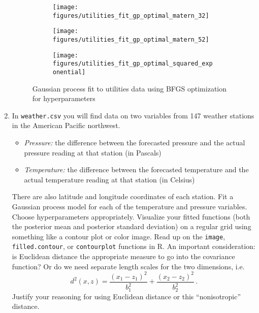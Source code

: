 \documentclass[10pt]{article}
\begin{document}
\begin{enumerate}[label=(\Alph*)]
            \begin{figure}
                \centering
                \begin{subfigure}{.5\textwidth}
                  \centering
                  \texttt{[image: figures/utilities\_fit\_gp\_optimal\_matern\_32]}
                \end{subfigure}%
                \begin{subfigure}{.5\textwidth}
                  \centering
                  \texttt{[image: figures/utilities\_fit\_gp\_optimal\_matern\_52]}
                \end{subfigure}
                \begin{subfigure}{.5\textwidth}
                  \centering
                  \texttt{[image: figures/utilities\_fit\_gp\_optimal\_squared\_exponential]}
                \end{subfigure}
            \caption{Gaussian process fit to utilities data using BFGS optimization for hyperparameters}
            \label{fig:gp_fit_utilities_optimal_lm}
            \end{figure}

            \clearpage

            \item In \verb|weather.csv| you will find data on two variables from 147 weather stations in the American Pacific northwest.
            \begin{itemize}
                \item \textit{Pressure:} the difference between the forecasted pressure and the actual pressure reading at that station (in Pascals)
                \item \textit{Temperature:} the difference between the forecasted temperature and the actual temperature reading at that station (in Celsius)
            \end{itemize}
            There are also latitude and longitude coordinates of each  station.  Fit a Gaussian process model for each of the temperature and pressure variables.  Choose hyperparameters appropriately.  Visualize your fitted functions (both the posterior mean and posterior standard deviation) on a regular grid using something like a contour plot or color image.  Read up on the \verb|image|, \verb|filled.contour|, or \verb|contourplot| functions in R.  An important consideration: is Euclidean distance the appropriate measure to go into the covariance function?  Or do we need separate length scales for the two dimensions, i.e.
            $$
            d^2(x, z) = \frac{(x_1 - z_1)^2}{b_1^2} +  \frac{(x_2 - z_2)^2}{b_2^2} \, .
            $$
            Justify your reasoning for using Euclidean distance or this ``nonisotropic'' distance.


\end{enumerate}
\end{document}
